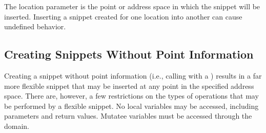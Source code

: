The location parameter is the point or address space in which the snippet will be inserted. Inserting a snippet created for one location into another can cause undefined behavior.

\subsection{Creating Snippets Without Point Information}
\label{sec:nopoint}

Creating a snippet without point information (i.e., calling
 with a ) results in a far
more flexible snippet that may be inserted at any point in the specified address
space. There are, however, a few restrictions on the types of operations that
may be performed by a flexible snippet. No local variables may be accessed,
including parameters and return values. Mutatee variables must be accessed
through the  domain.

